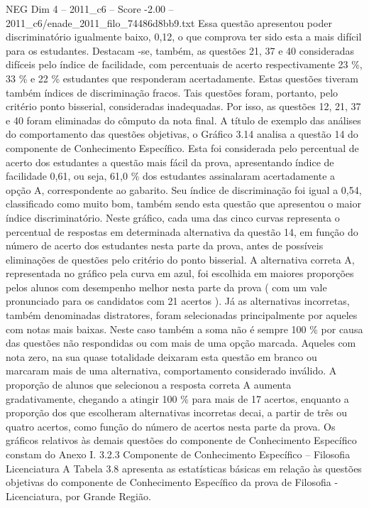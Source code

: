 \begin{textsample}{NEG Dim 4 – 2011\_c6 – Score -2.00 – 2011\_c6/enade\_2011\_filo\_74486d8bb9.txt}
Essa questão apresentou poder discriminatório igualmente baixo, 0,12, o que comprova ter sido esta a mais difícil para os estudantes.
Destacam -se, também, as questões 21, 37 e 40 consideradas difíceis pelo índice de facilidade, com percentuais de acerto respectivamente 23 \%, 33 \% e 22 \% estudantes que responderam acertadamente.
Estas questões tiveram também índices de discriminação fracos.
Tais questões foram, portanto, pelo critério ponto bisserial, consideradas inadequadas.
Por isso, as questões 12, 21, 37 e 40 foram eliminadas do cômputo da nota final.
A título de exemplo das análises do comportamento das questões objetivas, o Gráfico 3.14 analisa a questão 14 do componente de Conhecimento Específico.
Esta foi considerada pelo percentual de acerto dos estudantes a questão mais fácil da prova, apresentando índice de facilidade 0,61, ou seja, 61,0 \% dos estudantes assinalaram acertadamente a opção A, correspondente ao gabarito.
Seu índice de discriminação foi igual a 0,54, classificado como muito bom, também sendo esta questão que apresentou o maior índice discriminatório.
Neste gráfico, cada uma das cinco curvas representa o percentual de respostas em determinada alternativa da questão 14, em função do número de acerto dos estudantes nesta parte da prova, antes de possíveis eliminações de questões pelo critério do ponto bisserial.
A alternativa correta A, representada no gráfico pela curva em azul, foi escolhida em maiores proporções pelos alunos com desempenho melhor nesta parte da prova ( com um vale pronunciado para os candidatos com 21 acertos ).
Já as alternativas incorretas, também denominadas distratores, foram selecionadas principalmente por aqueles com notas mais baixas.
Neste caso também a soma não é sempre 100 \% por causa das questões não respondidas ou com mais de uma opção marcada.
Aqueles com nota zero, na sua quase totalidade deixaram esta questão em branco ou marcaram mais de uma alternativa, comportamento considerado inválido.
A proporção de alunos que selecionou a resposta correta A aumenta gradativamente, chegando a atingir 100 \% para mais de 17 acertos, enquanto a proporção dos que escolheram alternativas incorretas decai, a partir de três ou quatro acertos, como função do número de acertos nesta parte da prova.
Os gráficos relativos às demais questões do componente de Conhecimento Específico constam do Anexo I. 3.2.3 Componente de Conhecimento Específico – Filosofia Licenciatura A Tabela 3.8 apresenta as estatísticas básicas em relação às questões objetivas do componente de Conhecimento Específico da prova de Filosofia - Licenciatura, por Grande Região.

\end{textsample}
